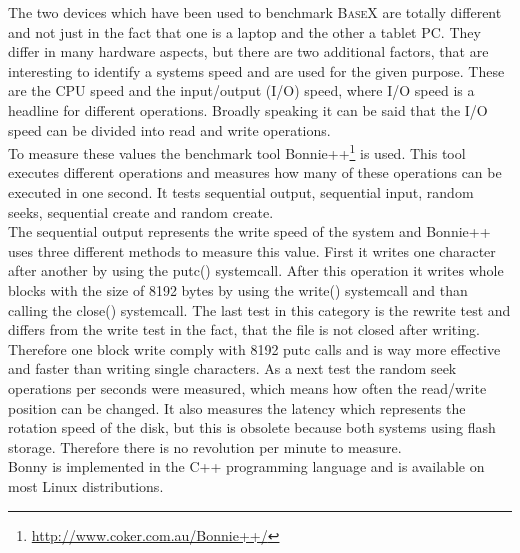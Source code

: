 The two devices which have been used to benchmark \textsc{BaseX} are totally different and not just in the fact that one is a laptop and the other a tablet PC.
They differ in many hardware aspects, but there are two additional factors, that are interesting to identify a systems speed and are used for the given purpose.
These are the CPU speed and the input/output (I/O) speed, where I/O speed is a headline for different operations.
Broadly speaking it can be said that the I/O speed can be divided into read and write operations.\\
To measure these values the benchmark tool Bonnie++\footnote{\url{http://www.coker.com.au/Bonnie++/}} is used.
This tool executes different operations and measures how many of these operations can be executed in one second.
It tests sequential output, sequential input, random seeks, sequential create and random create.\\
The sequential output represents the write speed of the system and Bonnie++ uses three different methods to measure this value.
First it writes one character after another by using the \textsf{putc()} systemcall. 
After this operation it writes whole blocks with the size of 8192 bytes by using the \textsf{write()} systemcall and than calling the \textsf{close()} systemcall.
The last test in this category is the rewrite test and differs from the write test in the fact, that the file is not closed after writing.
Therefore one block write comply with 8192 \textsf{putc} calls and is way more effective and faster than writing single characters.
As a next test the random seek operations per seconds were measured, which means how often the read/write position can be changed.
It also measures the latency which represents the rotation speed of the disk, but this is obsolete because both systems using flash storage.
Therefore there is no revolution per minute to measure.\\
Bonny is implemented in the C++ programming language and is available on most Linux distributions.
